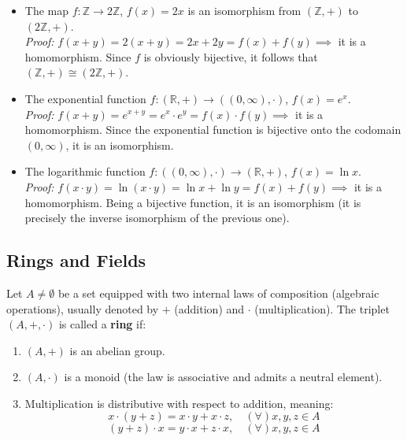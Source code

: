 \begin{example}\leavevmode
\begin{itemize}
    \item The map $f: \mathbb{Z} \rightarrow 2\mathbb{Z}$, $f(x) = 2x$ is an isomorphism from $(\mathbb{Z}, +)$ to $(2\mathbb{Z}, +)$. \\
    \textit{Proof:} $f(x + y) = 2(x + y) = 2x + 2y = f(x) + f(y) \implies$ it is a homomorphism. Since $f$ is obviously bijective, it follows that $(\mathbb{Z}, +) \cong (2\mathbb{Z}, +)$.
    \item The exponential function $f: (\mathbb{R}, +) \rightarrow ((0, \infty), \cdot)$, $f(x) = e^x$. \\
    \textit{Proof:} $f(x + y) = e^{x+y} = e^x \cdot e^y = f(x) \cdot f(y) \implies$ it is a homomorphism. Since the exponential function is bijective onto the codomain $(0, \infty)$, it is an isomorphism.
    \item The logarithmic function $f: ((0, \infty), \cdot) \rightarrow (\mathbb{R}, +)$, $f(x) = \ln x$. \\
    \textit{Proof:} $f(x \cdot y) = \ln(x \cdot y) = \ln x + \ln y = f(x) + f(y) \implies$ it is a homomorphism. Being a bijective function, it is an isomorphism (it is precisely the inverse isomorphism of the previous one).
\end{itemize}
\end{example}


\subsection*{Rings and Fields}

\begin{definition}
Let $A \neq \emptyset$ be a set equipped with two internal laws of composition (algebraic operations), usually denoted by $+$ (addition) and $\cdot$ (multiplication). The triplet $(A, +, \cdot)$ is called a \textbf{ring} if:
\begin{enumerate}
    \item $(A, +)$ is an abelian group.
    \item $(A, \cdot)$ is a monoid (the law is associative and admits a neutral element).
    \item Multiplication is distributive with respect to addition, meaning:
    $$ x \cdot (y + z) = x \cdot y + x \cdot z, \quad (\forall) x, y, z \in A $$
    $$ (y + z) \cdot x = y \cdot x + z \cdot x, \quad (\forall) x, y, z \in A $$
\end{enumerate}
\end{definition}

